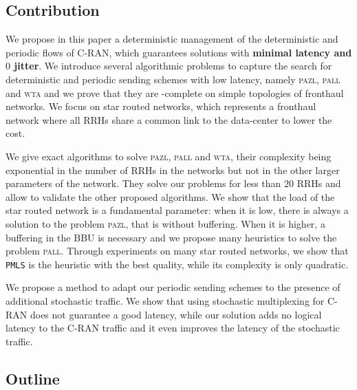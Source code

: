 \documentclass[a4paper,10pt]{journal}
\newcommand\PMLS{\texttt{PMLS}\xspace}
\newcommand\pazl{\textsc{pazl}\xspace}
\newcommand\pall{\textsc{pall}\xspace}
\newcommand\wta{\textsc{wta}\xspace}
\begin{document}
\subsection*{Contribution}

We propose in this paper a deterministic management of the deterministic and periodic flows of C-RAN, which guarantees solutions with \textbf{minimal latency and $0$ jitter}. We introduce several algorithmic problems to capture the search for deterministic and periodic sending schemes with low latency, namely \pazl, \pall and \wta and we prove that they are \NP-complete on simple topologies of fronthaul networks. We focus on star routed networks, which represents a fronthaul network where all RRHs share a common link to 
the data-center to lower the cost. 

We give exact algorithms to solve \pazl, \pall and \wta, their complexity being exponential in the number of RRHs in the networks
but not in the other larger parameters of the network. They solve our problems for less than $20$ RRHs and allow to validate the other proposed algorithms. 
We show that the load of the star routed network is a fundamental parameter: when it is low, there is always a solution to the problem
\pazl, that is without buffering. When it is higher, a buffering in the BBU is necessary and we propose many heuristics to solve the problem \pall. 
Through experiments on many star routed networks, we show that \PMLS is the heuristic with the best quality, while its complexity is only quadratic.

We propose a method to adapt our periodic sending schemes to the presence of additional stochastic traffic. We show that using stochastic multiplexing for C-RAN does not 
guarantee a good latency, while our solution adds no logical latency to the C-RAN traffic and it even improves the latency of the stochastic traffic. 

\subsection*{Outline}
\end{document}
